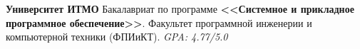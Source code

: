 
\vspace{0.8em}
\begin{scholarship}
     {\textbf{Университет ИТМО} \newline
     Бакалавриат по программе \textbf{<<Системное и прикладное программное обеспечение>>}. \newline
     Факультет программной инженерии и компьютерной техники (ФПИиКТ). \newline
     {}\enspace\textperiodcentered\enspace \textit{GPA: 4.77/5.0}}
\end{scholarship}
